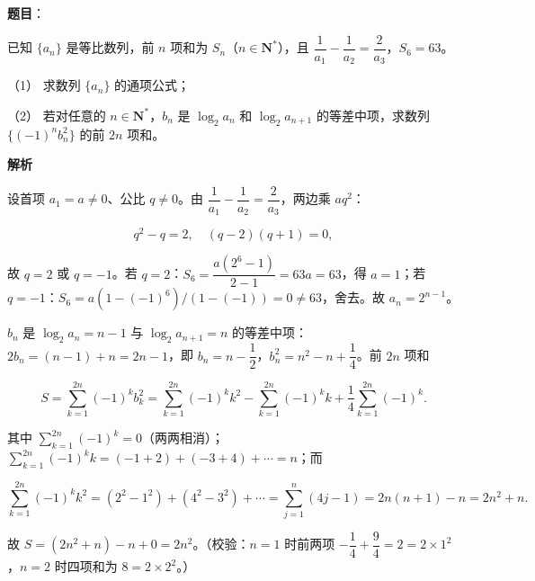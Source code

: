 \begin{answer}

\textbf{题目}：

已知 \(\{a_{n}\}\) 是等比数列，前 \(n\) 项和为 \(S_{n}\)（\(n\in\mathbf{N}^{*}\)），且 \(\dfrac{1}{a_{1}}-\dfrac{1}{a_{2}}=\dfrac{2}{a_{3}}\)，\(S_{6}=63\)。

（1） 求数列 \(\{a_{n}\}\) 的通项公式；

（2） 若对任意的 \(n\in\mathbf{N}^{*}\)，\(b_{n}\) 是 \(\log_{2}a_{n}\) 和 \(\log_{2}a_{n+1}\) 的等差中项，求数列 \(\{(-1)^{n}b_{n}^{2}\}\) 的前 \(2n\) 项和。

\textbf{解析}


设首项 \(a_{1}=a\neq 0\)、公比 \(q\neq 0\)。由 \(\dfrac{1}{a_{1}}-\dfrac{1}{a_{2}}=\dfrac{2}{a_{3}}\)，两边乘 \(aq^{2}\)：

\nopagebreak[4]
\[
q^{2}-q=2,\quad (q-2)(q+1)=0,
\]

故 \(q=2\) 或 \(q=-1\)。若 \(q=2\)：\(S_{6}=\dfrac{a(2^{6}-1)}{2-1}=63a=63\)，得 \(a=1\)；若 \(q=-1\)：\(S_{6}=a\left(1-(-1)^{6}\right)/\left(1-(-1)\right)=0\neq 63\)，舍去。故 \(a_{n}=2^{n-1}\)。


\(b_{n}\) 是 \(\log_{2}a_{n}=n-1\) 与 \(\log_{2}a_{n+1}=n\) 的等差中项：\(2b_{n}=(n-1)+n=2n-1\)，即 \(b_{n}=n-\dfrac{1}{2}\)，\(b_{n}^{2}=n^{2}-n+\dfrac{1}{4}\)。前 \(2n\) 项和

\nopagebreak[4]
\[
S=\sum_{k=1}^{2n}(-1)^{k}b_{k}^{2}=\sum_{k=1}^{2n}(-1)^{k}k^{2}-\sum_{k=1}^{2n}(-1)^{k}k+\dfrac{1}{4}\sum_{k=1}^{2n}(-1)^{k}.
\]

其中 \(\sum\limits_{k=1}^{2n}(-1)^{k}=0\)（两两相消）；\(\sum\limits_{k=1}^{2n}(-1)^{k}k=(-1+2)+(-3+4)+\cdots=n\)；而

\nopagebreak[4]
\[
\sum_{k=1}^{2n}(-1)^{k}k^{2}=\left(2^{2}-1^{2}\right)+\left(4^{2}-3^{2}\right)+\cdots=\sum_{j=1}^{n}(4j-1)=2n(n+1)-n=2n^{2}+n.
\]

故 \(S=(2n^{2}+n)-n+0=2n^{2}\)。（校验：\(n=1\) 时前两项 \(-\dfrac{1}{4}+\dfrac{9}{4}=2=2\times 1^{2}\)，\(n=2\) 时四项和为 \(8=2\times 2^{2}\)。）



\end{answer}
